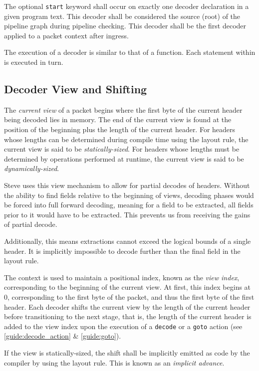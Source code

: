 The optional \texttt{start} keyword shall occur on exactly one decoder declaration in a given program text. This decoder shall be considered the source (root) of the pipeline graph during pipeline checking. This decoder shall be the first decoder applied to a packet context after ingress.

The execution of a decoder is similar to that of a function. Each statement within  is executed in turn.

\subsection{Decoder View and Shifting} \label{guide:decoder_view}

The \textit{current view} of a packet begins where the first byte of the current header being decoded lies in memory. The end of the current view is found at the position of the beginning plus the length of the current header. For headers whose lengths can be determined during compile time using the layout rule, the current view is said to be \textit{statically-sized}. For headers whose lengths must be determined by operations performed at runtime, the current view is said to be \textit{dynamically-sized}.

Steve uses this view mechanism to allow for partial decodes of headers. Without the ability to find fields relative to the beginning of views, decoding phases would be forced into full forward decoding, meaning for a field to be extracted, all fields prior to it would have to be extracted. This prevents us from receiving the gains of partial decode.

Additionally, this means extractions cannot exceed the logical bounds of a single header. It is implicitly impossible to decode further than the final field in the layout rule.

The context is used to maintain a positional index, known as the \textit{view index}, corresponding to the beginning of the current view. At first, this index begins at 0, corresponding to the first byte of the packet, and thus the first byte of the first header. Each decoder shifts the current view by the length of the current header before transitioning to the next stage, that is, the length of the current header is added to the view index upon the execution of a \texttt{decode} or a \texttt{goto} action (see \ref{guide:decode_action} \& \ref{guide:goto}).

If the view is statically-sized, the shift shall be implicitly emitted as code by the compiler by using the layout rule. This is known as an \textit{implicit advance}.


